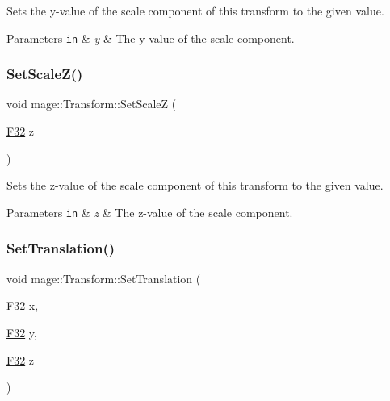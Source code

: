 Sets the y-\/value of the scale component of this transform to the given value.


\begin{DoxyParams}[1]{Parameters}
\mbox{\tt in}  & {\em y} & The y-\/value of the scale component. \\
\hline
\end{DoxyParams}
\hypertarget{structmage_1_1_transform_aa8fa7169c739cd1e005bbb373ccbf6c3}{}\label{structmage_1_1_transform_aa8fa7169c739cd1e005bbb373ccbf6c3} 
\subsubsection{\texorpdfstring{Set\+Scale\+Z()}{SetScaleZ()}}
{\footnotesize\ttfamily void mage\+::\+Transform\+::\+Set\+ScaleZ (\begin{DoxyParamCaption}\item[{\hyperlink{namespacemage_aa97e833b45f06d60a0a9c4fc22ae02c0}{F32}}]{z }\end{DoxyParamCaption})\hspace{0.3cm}{\ttfamily [noexcept]}}

Sets the z-\/value of the scale component of this transform to the given value.


\begin{DoxyParams}[1]{Parameters}
\mbox{\tt in}  & {\em z} & The z-\/value of the scale component. \\
\hline
\end{DoxyParams}
\hypertarget{structmage_1_1_transform_afb794877f9b538b5ce4b55e4cd8852f0}{}\label{structmage_1_1_transform_afb794877f9b538b5ce4b55e4cd8852f0} 
\subsubsection{\texorpdfstring{Set\+Translation()}{SetTranslation()}\hspace{0.1cm}{\footnotesize\ttfamily [1/4]}}
{\footnotesize\ttfamily void mage\+::\+Transform\+::\+Set\+Translation (\begin{DoxyParamCaption}\item[{\hyperlink{namespacemage_aa97e833b45f06d60a0a9c4fc22ae02c0}{F32}}]{x,  }\item[{\hyperlink{namespacemage_aa97e833b45f06d60a0a9c4fc22ae02c0}{F32}}]{y,  }\item[{\hyperlink{namespacemage_aa97e833b45f06d60a0a9c4fc22ae02c0}{F32}}]{z }\end{DoxyParamCaption})\hspace{0.3cm}{\ttfamily [noexcept]}}

